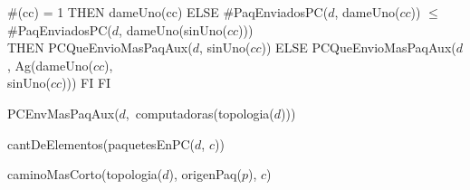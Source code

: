 \begin{tad}{}
	 { \IF \#(cc) = 1
												THEN dameUno(cc)
												ELSE {\IF \#PaqEnviadosPC($d$, dameUno($cc$)) $\leq$ \\
										        		 \hspace*{1.1em}\#PaqEnviadosPC($d$, dameUno(sinUno($cc$)))\\
											 		 THEN PCQueEnvioMasPaqAux($d$, sinUno($cc$))
											 		 ELSE PCQueEnvioMasPaqAux($d$, Ag(dameUno($cc$), \\
											 		 \hspace*{14em}				      sinUno($cc$)))
													 FI}
												FI}
	
	 {\mbox{PCEnvMasPaqAux($d$, computadoras(topologia($d$)))}}
	
	 {cantDeElementos(paquetesEnPC($d$, $c$))}
	
	 {caminoMasCorto(topologia($d$), origenPaq($p$), $c$)}
					
\end{tad}
